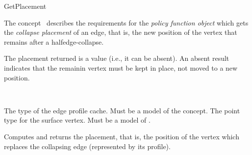 
\begin{ccRefConcept}{GetPlacement}


\ccDefinition

The concept \ccRefName\ describes the requirements for the {\em policy
function object} which gets the {\em collapse placement} of an edge,
that is, the new position of the vertex that remains after a 
halfedge-collapse.

The placement returned is a  value (i.e., it can
be absent). An absent result indicates that the remainin vertex 
must be kept in place, not moved to a new position.

\ccRefines
{}\\

\ccTypes
  {The type of the edge profile cache. Must be a model of the  concept.}{}
\ccGlue    
  {The point type for the surface vertex.  Must be a model of .}
\ccGlue    


\ccOperations

  {Computes and returns the placement, that is, the position of the vertex 
  which replaces the collapsing edge (represented by its profile).}
  
\ccHasModels
{}\\

\end{ccRefConcept}

